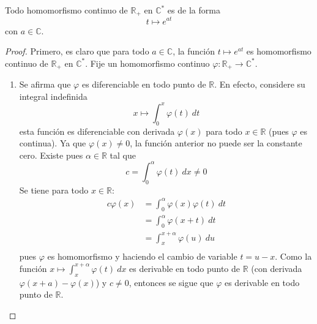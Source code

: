 \documentclass[12pt]{report}
\theoremstyle{largebreak}
\newcommand\cf[3]{\ensuremath{#1:#2\rightarrow#3}}
\begin{document}
    \begin{propo}
        Todo homomorfismo continuo de $\mathbb{R}_+$ en $\mathbb{C}^*$ es de la forma
        \begin{equation*}
            t\mapsto e^{ at}
        \end{equation*}
        con $a\in\mathbb{C}$.
    \end{propo}

    \begin{proof}
        Primero, es claro que para todo $a\in\mathbb{C}$, la función $t\mapsto e^{at}$ es homomorfismo continuo de $\mathbb{R}_+$ en $\mathbb{C}^*$. Fije un homomorfismo continuo $\cf{\varphi}{\mathbb{R}_+}{\mathbb{C}^*}$.
        \begin{enumerate}
            \item Se afirma que $\varphi$ es diferenciable en todo punto de $\mathbb{R}$. En efecto, considere su integral indefinida
            \begin{equation*}
                x\mapsto \int_{0}^x \varphi(t)\:dt
            \end{equation*}
            esta función es diferenciable con derivada $\varphi(x)$ para todo $x\in\mathbb{R}$ (pues $\varphi$ es continua). Ya que $\varphi(x)\neq0$, la función anterior no puede ser la constante cero. Existe pues $\alpha\in\mathbb{R}$ tal que
            \begin{equation*}
                c=\int_0^\alpha\varphi(t)\:dx\neq0
            \end{equation*}
            Se tiene para todo $x\in\mathbb{R}$:
            \begin{equation*}
                \begin{split}
                    c\varphi(x)&=\int_0^{\alpha}\varphi(x)\varphi(t)\:dt\\
                    &=\int_0^{\alpha}\varphi(x+t)\:dt\\
                    &=\int_x^{x+\alpha}\varphi(u)\:du\\
                \end{split}
            \end{equation*}
            pues $\varphi$ es homomorfismo y haciendo el cambio de variable $t=u-x$. Como la función $x\mapsto \int_{x}^{x+\alpha}\varphi(t)\:dx$ es derivable en todo punto de $\mathbb{R}$ (con derivada $\varphi(x+a)-\varphi(x)$) y $c\neq0$, entonces se sigue que $\varphi$ es derivable en todo punto de $\mathbb{R}$.


\end{enumerate}
\end{proof}
\end{document}
